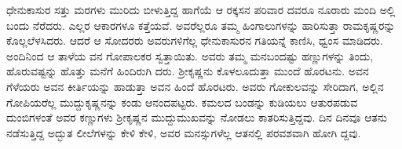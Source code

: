 ಧೇನುಕಾಸುರ ಸತ್ತು ಮರಗಳು ಮುರಿದು ಬೀಳುತ್ತಿದ್ದ ಹಾಗೆಯೆ ಆ ರಕ್ಕಸನ ಪರಿವಾರ ದವರೂ ನೂರಾರು ಮಂದಿ ಅಲ್ಲಿ ಬಂದು ನೆರೆದರು. ಎಲ್ಲರ ಆಕಾರಗಳೂ ಕತ್ತೆಯವೆ. ಅವರೆಲ್ಲರೂ ತಮ್ಮ ಹಿಂಗಾಲುಗಳನ್ನು ಹಾರಿಸುತ್ತಾ ರಾಮಕೃಷ್ಣರನ್ನು ಕೊಲ್ಲಲೆಳಸಿದರು. ಆದರೆ ಆ ಸೋದರರು ಅವರುಗಳಿಗೆಲ್ಲ ಧೇನುಕಾಸುರನ ಗತಿಯನ್ನೆ ಕಾಣಿಸಿ, ಧ್ವಂಸ ಮಾಡಿದರು. ಅಂದಿನಿಂದ ಆ ತಾಳೆಯ ವನ ಗೋಪಾಲಕರ ಸ್ವತ್ತಾಯಿತು. ಅವರು ತಮ್ಮ ಮನಬಂದಷ್ಟು ಹಣ್ಣುಗಳನ್ನು ತಿಂದು, ಹೊರುವಷ್ಟನ್ನು ಹೊತ್ತು ಮನೆಗೆ ಹಿಂದಿರುಗಿ ದರು. ಶ್ರೀಕೃಷ್ಣನು ಕೊಳಲೂದುತ್ತಾ ಮುಂದೆ ಹೊರಟನು. ಅವನ ಗೆಳೆಯರು ಅವನ ಕೀರ್ತಿಯನ್ನು ಹಾಡುತ್ತಾ ಅವನ ಹಿಂದೆ ಹೊರಟರು. ಅವರು ಗೋಕುಲವನ್ನು ಸೇರಿದಾಗ, ಅಲ್ಲಿನ ಗೋಪಿಯರೆಲ್ಲ ಮುದ್ದುಕೃಷ್ಣನನ್ನು ಕಂಡು ಆನಂದಪಟ್ಟರು. ಕಮಲದ ಬಂಡನ್ನು ಕುಡಿಯಲು ಆತುರಪಡುವ ದುಂಬಿಗಳಂತೆ ಅವರ ಕಣ್ಣುಗಳು ಶ್ರೀಕೃಷ್ಣನ ಮುದ್ದುಮುಖವನ್ನು ನೋಡಲು ಕಾತರಿಸುತ್ತಿದ್ದವು. ದಿನ ದಿನವೂ ಆತನು ನಡೆಸುತ್ತಿದ್ದ ಅದ್ಭುತ ಲೀಲೆಗಳನ್ನು ಕೇಳಿ ಕೇಳಿ, ಅವರ ಮನಸ್ಸುಗಳೆಲ್ಲ ಆತನಲ್ಲಿ ಪರವಶವಾಗಿ ಹೋಗಿ ದ್ದವು.

